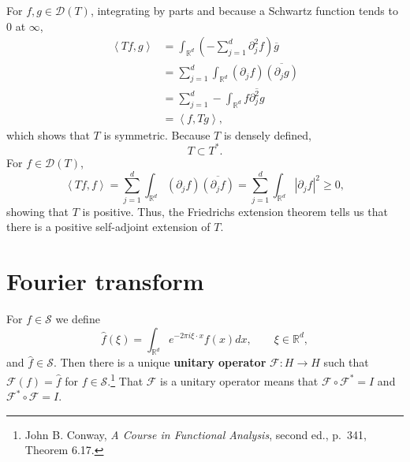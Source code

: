 \documentclass{article}
\newcommand{\inner}[2]{\left\langle #1, #2 \right\rangle}
\theoremstyle{definition}
\begin{document}
For $f,g \in \mathscr{D}(T)$, integrating by parts and because a Schwartz function tends to $0$ at $\infty$,
\begin{align*}
\inner{T f}{g}&=\int_{\mathbb{R}^d} \left( -\sum_{j=1}^d \partial_j^2 f \right) \overline{g} \\
&=\sum_{j=1}^d \int_{\mathbb{R}^d} (\partial_j f)\overline{(\partial_j g)}\\
&=\sum_{j=1}^d -\int_{\mathbb{R}^d} f \overline{\partial_j^2 g}\\
&=\inner{f}{T g},
\end{align*}
which shows that $T$ is symmetric. Because $T$ is densely defined,
\[
T \subset T^*.
\]
For $f \in \mathscr{D}(T)$,
\[
\inner{Tf}{f} = \sum_{j=1}^d \int_{\mathbb{R}^d} (\partial_j f)\overline{(\partial_j f)}
=\sum_{j=1}^d \int_{\mathbb{R}^d} |\partial_j f|^2 \geq 0,
\]
showing that $T$ is positive. Thus,  the Friedrichs extension theorem tells us that there is a positive self-adjoint extension of $T$. 


\section{Fourier transform}
For $f \in \mathscr{S}$ we define
\[
\hat{f}(\xi) = \int_{\mathbb{R}^d} e^{-2\pi i\xi \cdot x} f(x) dx, \qquad \xi \in \mathbb{R}^d,
\]
and $\hat{f} \in \mathscr{S}$. 
Then there is a unique \textbf{unitary operator} $\mathscr{F}:H \to H$ such that $\mathscr{F}(f) = \hat{f}$ for $f \in \mathscr{S}$.\footnote{John
B. Conway, {\em A Course in Functional Analysis}, second ed., p.~341, Theorem 6.17.}
That $\mathscr{F}$ is a unitary operator means that $\mathscr{F} \circ \mathscr{F}^*=I$ and $\mathscr{F}^* \circ \mathscr{F}=I$.
\end{document}
